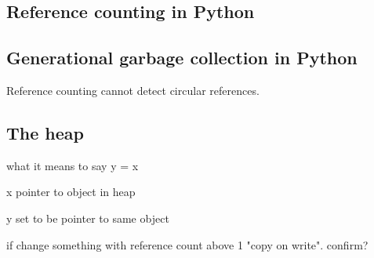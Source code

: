 
\subsection{Reference counting in Python}


\subsection{Generational garbage collection in Python}

Reference counting cannot detect circular references.


\subsection{The heap}
what it means to say y = x

x pointer to object in heap

y set to be pointer to same object

if change something with reference count above 1 "copy on write". confirm?

